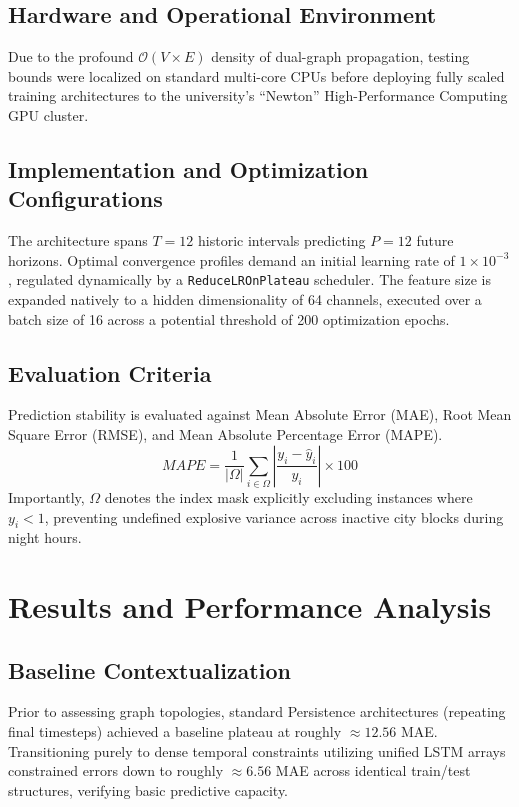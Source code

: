 \documentclass{rapportECL}
\begin{document}
\subsection{Hardware and Operational Environment}
Due to the profound $\mathcal{O}(V \times E)$ density of dual-graph propagation, testing bounds were localized on standard multi-core CPUs before deploying fully scaled training architectures to the university's ``Newton'' High-Performance Computing GPU cluster.

\subsection{Implementation and Optimization Configurations}
The architecture spans $T=12$ historic intervals predicting $P=12$ future horizons. Optimal convergence profiles demand an initial learning rate of $1 \times 10^{-3}$, regulated dynamically by a \texttt{ReduceLROnPlateau} scheduler. The feature size is expanded natively to a hidden dimensionality of 64 channels, executed over a batch size of 16 across a potential threshold of 200 optimization epochs. 

\subsection{Evaluation Criteria}
Prediction stability is evaluated against Mean Absolute Error (MAE), Root Mean Square Error (RMSE), and Mean Absolute Percentage Error (MAPE). 
\begin{equation}
MAPE = \frac{1}{|\Omega|} \sum_{i \in \Omega} \left| \frac{y_i - \hat{y}_i}{y_i} \right| \times 100
\end{equation}
Importantly, $\Omega$ denotes the index mask explicitly excluding instances where $y_i < 1$, preventing undefined explosive variance across inactive city blocks during night hours.

\section{Results and Performance Analysis}

\subsection{Baseline Contextualization}
Prior to assessing graph topologies, standard Persistence architectures (repeating final timesteps) achieved a baseline plateau at roughly $\approx 12.56$ MAE. Transitioning purely to dense temporal constraints utilizing unified LSTM arrays constrained errors down to roughly $\approx 6.56$ MAE across identical train/test structures, verifying basic predictive capacity.
\end{document}
